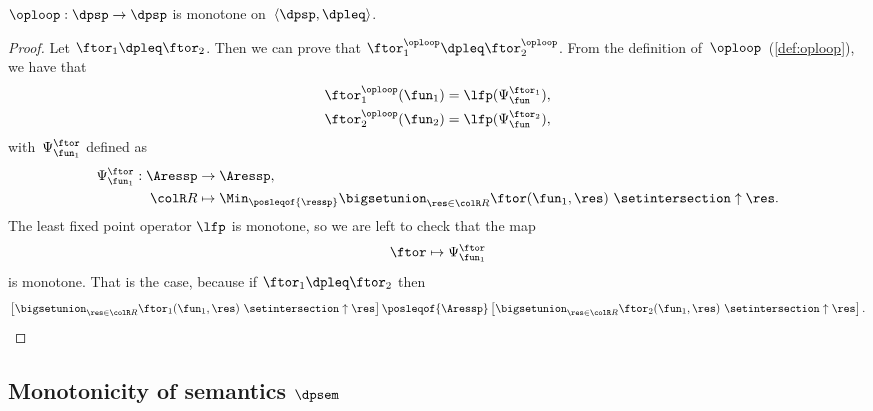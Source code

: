 \begin{lemma}
    \label{lem:loop-monotone}$\oploop:\dpsp\rightarrow\dpsp$ is monotone
    on~$\langle\dpsp,\dpleq\rangle$.
\end{lemma}
\begin{proof}
    Let $\ftor_{1}\dpleq\ftor_{2}$.
    Then we can prove that $\ftor_{1}^{\oploop}\dpleq\ftor_{2}^{\oploop}$.
    From the definition of~$\oploop$~(\cref{def:oploop}), we
    have that
    \begin{align*}
        \ftor_{1}^{\oploop}(\fun_{1}) & =\lfp(\Psi_{\fun}^{\ftor_{1}}), \\
        \ftor_{2}^{\oploop}(\fun_{2}) & =\lfp(\Psi_{\fun}^{\ftor_{2}}),
    \end{align*}
    with~$\Psi_{\fun_{1}}^{\ftor}$ defined as
    \begin{align*}
        \Psi_{\fun_{1}}^{\ftor}:\Aressp & \rightarrow\Aressp, \\
        {\colR R}                       & \mapsto\Min_{\posleqof{\ressp}}\bigsetunion_{\res\in{\colR R}}\ftor(\fun_{1},\res)\ \setintersection\uparrow\res.
    \end{align*}
    The least fixed point operator $\lfp$ is monotone, so we are left
    to check that the map
    \[
        \ftor\mapsto\Psi_{\fun_{1}}^{\ftor}
    \]
    is monotone.
    That is the case, because if $\ftor_{1}\dpleq\ftor_{2}$
    then
    \[
        \left[\bigsetunion_{\res\in{\colR R}}\ftor_{1}(\fun_{1},\res)\ \setintersection\uparrow\res\right]\posleqof{\Aressp}\left[\bigsetunion_{\res\in{\colR R}}\ftor_{2}(\fun_{1},\res)\ \setintersection\uparrow\res\right].
    \]
\end{proof}

\subsection{Monotonicity of semantics $\dpsem$}

